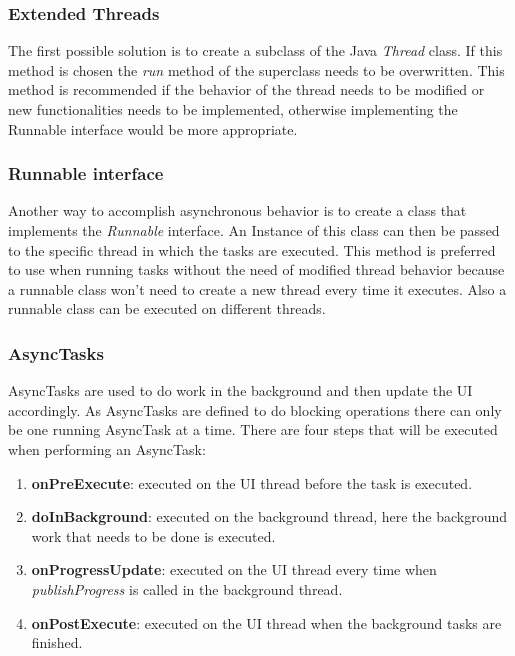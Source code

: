 	\subsubsection{Extended Threads}
	The first possible solution is to create a subclass of the Java \emph{Thread} class. If this method is chosen the \emph{run} method of the superclass needs to be overwritten. This method is recommended if the behavior of the thread needs to be modified or new functionalities needs to be implemented, otherwise implementing the Runnable interface would be more appropriate.

	\subsubsection{Runnable interface}
	Another way to accomplish asynchronous behavior is to create a class that implements the \emph{Runnable} interface. An Instance of this class can then be passed to the specific thread in which the tasks are executed. This method is preferred to use when running tasks without the need of modified thread behavior because a runnable class won't need to create a new thread every time it executes. Also a runnable class can be executed on different threads.

	\subsubsection{AsyncTasks}
	AsyncTasks are used to do work in the background and then update the UI accordingly. As AsyncTasks are defined to do blocking operations there can only be one running AsyncTask at a time. There are four steps that will be executed when performing an AsyncTask:

	\begin{enumerate}
		\item \textbf{onPreExecute}: executed on the UI thread before the task is executed.
		\item \textbf{doInBackground}: executed on the background thread, here the background work that needs to be done is executed.
		\item \textbf{onProgressUpdate}: executed on the UI thread every time when \emph{publishProgress} is called in the background thread.
		\item \textbf{onPostExecute}: executed on the UI thread when the background tasks are finished.
	\end{enumerate}

